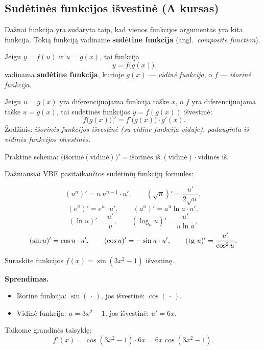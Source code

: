 \subsection{Sudėtinės funkcijos išvestinė (A kursas)}

Dažnai funkcija yra sudaryta taip, kad vienos funkcijos argumentas yra kita
funkcija. Tokią funkciją vadiname \textbf{sudėtine funkcija} (angl.\ \textit{composite function}).

\begin{definition}
Jeigu $y = f(u)$ ir $u = g(x)$, tai funkcija
\[
    y = f\bigl(g(x)\bigr)
\]
vadinama \textbf{sudėtine funkcija}, kurioje $g(x)$ --- \textit{vidinė funkcija},
o $f$ --- \textit{išorinė funkcija}.
\end{definition}

\begin{tcolorbox}[title={Sudėtinės funkcijos išvestinė (grandinės taisyklė)},
                  colback=orange!5, colframe=orange!60!black]
Jeigu $u = g(x)$ yra diferencijuojama funkcija taške $x$, o $f$ yra diferencijuojama
taške $u = g(x)$, tai sudėtinės funkcijos $y = f(g(x))$ išvestinė:
\[
    \bigl[f\bigl(g(x)\bigr)\bigr]' = f'\bigl(g(x)\bigr)\cdot g'(x).
\]
Žodžiais: \textit{išorinės funkcijos išvestinė (su vidine funkcija viduje), padauginta
iš vidinės funkcijos išvestinės.}
\end{tcolorbox}

Praktinė schema: $\bigl(\text{išorinė}(\text{vidinė})\bigr)' = \text{išorinės iš.}(\text{vidinė}) \cdot \text{vidinės iš.}$

\medskip
Dažniausiai VBE pasitaikančios sudėtinių funkcijų formulės:

\begin{tcolorbox}[colback=yellow!5, colframe=yellow!60!black]
\[
    (u^n)' = n\,u^{n-1}\cdot u', \qquad
    (\sqrt{u})' = \frac{u'}{2\sqrt{u}},
\]
\[
    (e^u)' = e^u \cdot u', \qquad
    (a^u)' = a^u \ln a \cdot u',
\]
\[
    (\ln u)' = \frac{u'}{u}, \qquad
    (\log_a u)' = \frac{u'}{u \ln a},
\]
\[
    (\sin u)' = \cos u \cdot u', \qquad
    (\cos u)' = -\sin u \cdot u', \qquad
    (\operatorname{tg}\,u)' = \frac{u'}{\cos^2 u}.
\]
\end{tcolorbox}

\begin{example}
Suraskite funkcijos $f(x) = \sin(3x^2 - 1)$ išvestinę.

\textbf{Sprendimas.}
\begin{itemize}
    \item Išorinė funkcija: $\sin(\,\cdot\,)$, jos išvestinė: $\cos(\,\cdot\,)$.
    \item Vidinė funkcija: $u = 3x^2 - 1$, jos išvestinė: $u' = 6x$.
\end{itemize}
Taikome grandinės taisyklę:
\[
    f'(x) = \cos(3x^2-1) \cdot 6x = 6x\cos(3x^2-1).
\]
\end{example}

